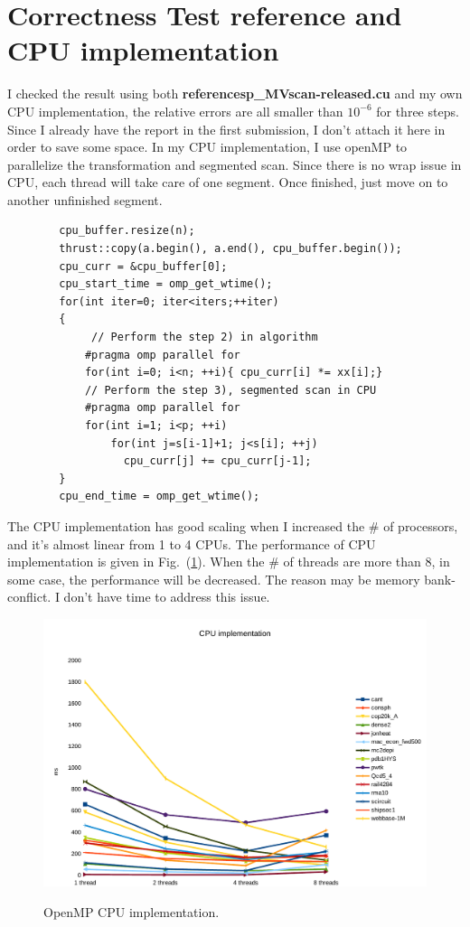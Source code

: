\documentclass[preprint, prX, amsmath,amssymb]{revtex4-1}
\begin{document}
\section{Correctness Test reference and CPU implementation}

I  checked the result using both \textbf{referencesp\_MVscan-released.cu} and my own CPU implementation, the relative errors are all smaller than $10^{-6}$ for three steps. Since I already have the report in the first submission, I don't attach it here in order to save some space. In my CPU implementation, I  use openMP to parallelize the transformation and segmented scan. Since there is no wrap issue in CPU, each thread will take care of one segment. Once finished, just move on to another unfinished segment. 

\begin{lstlisting}
        cpu_buffer.resize(n);
        thrust::copy(a.begin(), a.end(), cpu_buffer.begin());
        cpu_curr = &cpu_buffer[0];        
        cpu_start_time = omp_get_wtime(); 
        for(int iter=0; iter<iters;++iter)
        {  
             // Perform the step 2) in algorithm
            #pragma omp parallel for 
            for(int i=0; i<n; ++i){ cpu_curr[i] *= xx[i];}
            // Perform the step 3), segmented scan in CPU
            #pragma omp parallel for 
            for(int i=1; i<p; ++i)
                for(int j=s[i-1]+1; j<s[i]; ++j) 
                  cpu_curr[j] += cpu_curr[j-1]; 
        }
        cpu_end_time = omp_get_wtime();
\end{lstlisting}

The CPU implementation has good scaling when I increased the \# of processors, and it's almost linear from 1 to 4 CPUs. The performance of CPU implementation is given in Fig.~(\ref{CPU}). When the \# of threads are more than 8, in some case, the performance will be decreased. The reason may be memory bank-conflict. I don't have time to address this issue.
\begin{figure}
  \includegraphics[width=15.2cm]{CPU}\\
\caption{OpenMP CPU implementation.}
\label{CPU}

\end{figure}
\end{document}
